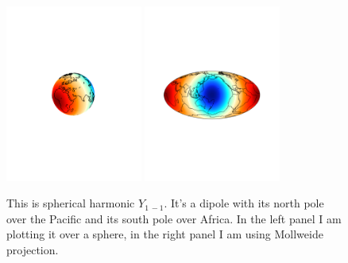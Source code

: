 \documentclass[11pt]{article}
\newcommand{\Yfun}{Y}
\begin{document}
\begin{figure}%
\centering \includegraphics[width=0.4\textwidth,trim = 7cm 10cm 7cm
  10cm, clip]{figures/Y1m1} \includegraphics[width=0.4\textwidth,trim
  = 3cm 9cm 3cm 10cm, clip]{figures/Y1m1_Mol}
\caption{This is spherical harmonic $\Yfun_{1\,-1}$. It's a dipole
  with its north pole over the Pacific and its south pole over
  Africa. In the left panel I am plotting it over a sphere, in the
  right panel I am using Mollweide projection.}
\label{Y1m1fig}
\end{figure}
 
\end{document}
